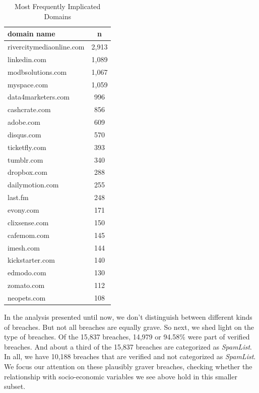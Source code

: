 \documentclass[sigconf]{acmart}
\begin{document}
\begin{table}[h!]
\centering
\caption{Most Frequently Implicated Domains}
\begin{tabular}{ l c }
\hline    
domain name & n \\
\hline
rivercitymediaonline.com &   2,913 \\
linkedin.com             &   1,089 \\
modbsolutions.com        &   1,067\\
myspace.com              &   1,059\\
data4marketers.com       &    996\\
cashcrate.com            &    856\\
adobe.com                &    609\\
disqus.com               &    570\\
ticketfly.com            &    393\\
tumblr.com               &    340\\
dropbox.com              &    288\\
dailymotion.com          &    255\\
last.fm                  &    248\\
evony.com                &    171\\
clixsense.com            &    150\\
cafemom.com              &    145\\
imesh.com                &    144\\
kickstarter.com          &    140\\
edmodo.com               &    130\\
zomato.com               &    112\\
neopets.com              &    108\\
\hline
\end{tabular}
\label{table:domain_dat}
\end{table}

In the analysis presented until now, we don't distinguish between different kinds of breaches. But not all breaches are equally grave. So next, we shed light on the type of breaches.  Of the 15,837 breaches, 14,979 or 94.58\% were part of verified breaches. And about a third of the 15,837 breaches are categorized as {\it SpamList}. In all, we have 10,188 breaches that are verified and not categorized as {\it SpamList}. We focus our attention on these plausibly graver breaches, checking whether the relationship with socio-economic variables we see above hold in this smaller subset. 
\end{document}
